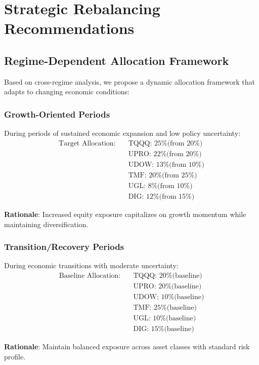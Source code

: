 \documentclass[onecolumn,11pt]{IEEEtran}
\begin{document}
\section{Strategic Rebalancing Recommendations}

\subsection{Regime-Dependent Allocation Framework}

Based on cross-regime analysis, we propose a dynamic allocation framework that adapts to changing economic conditions:

\subsubsection{Growth-Oriented Periods}
During periods of sustained economic expansion and low policy uncertainty:
\begin{align}
\text{Target Allocation:} \quad &\text{TQQQ: 25\% (from 20\%)} \\
&\text{UPRO: 22\% (from 20\%)} \\
&\text{UDOW: 13\% (from 10\%)} \\
&\text{TMF: 20\% (from 25\%)} \\
&\text{UGL: 8\% (from 10\%)} \\
&\text{DIG: 12\% (from 15\%)}
\end{align}

\textbf{Rationale}: Increased equity exposure capitalizes on growth momentum while maintaining diversification.

\subsubsection{Transition/Recovery Periods}
During economic transitions with moderate uncertainty:
\begin{align}
\text{Baseline Allocation:} \quad &\text{TQQQ: 20\% (baseline)} \\
&\text{UPRO: 20\% (baseline)} \\
&\text{UDOW: 10\% (baseline)} \\
&\text{TMF: 25\% (baseline)} \\
&\text{UGL: 10\% (baseline)} \\
&\text{DIG: 15\% (baseline)}
\end{align}

\textbf{Rationale}: Maintain balanced exposure across asset classes with standard risk profile.
\end{document}
